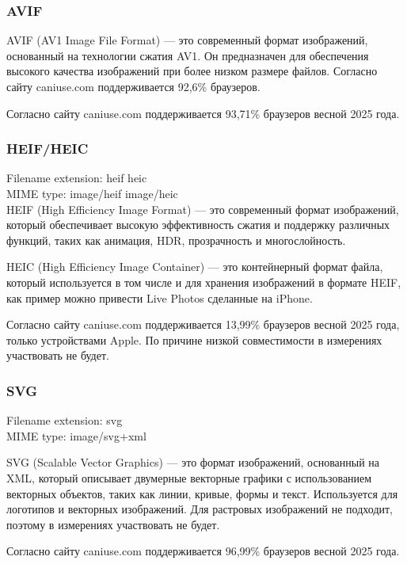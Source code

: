 \documentclass[12pt]{article}
\begin{document}
\subsubsection{AVIF}

AVIF (AV1 Image File Format) — это современный формат изображений,
основанный на технологии сжатия AV1. Он предназначен для обеспечения высокого
качества изображений при более низком размере файлов. Согласно сайту caniuse.com
поддерживается 92,6\% браузеров.

Согласно сайту caniuse.com поддерживается 93,71\% браузеров весной 2025 года.

\subsubsection{HEIF/HEIC}

Filename extension: heif heic\\
MIME type: image/heif image/heic\\

HEIF (High Efficiency Image Format) — это современный формат изображений,
который обеспечивает высокую эффективность сжатия и поддержку различных функций,
таких как анимация, HDR, прозрачность и многослойность.

HEIC (High Efficiency Image Container) — это контейнерный формат файла,
который используется в том числе и для хранения изображений в формате HEIF,
как пример можно привести Live Photos сделанные на iPhone.

Согласно сайту caniuse.com поддерживается 13,99\% браузеров весной 2025 года,
только устройствами Apple. По причине низкой совместимости в измерениях участвовать не будет.

\subsubsection{SVG}

Filename extension: svg\\
MIME type: image/svg+xml

SVG (Scalable Vector Graphics) — это формат изображений, основанный на XML,
который описывает двумерные векторные графики с использованием векторных объектов,
таких как линии, кривые, формы и текст. Используется для логотипов и векторных изображений.
Для растровых изображений не подходит, поэтому в измерениях участвовать не будет.

Согласно сайту caniuse.com поддерживается 96,99\% браузеров весной 2025 года.
\end{document}
